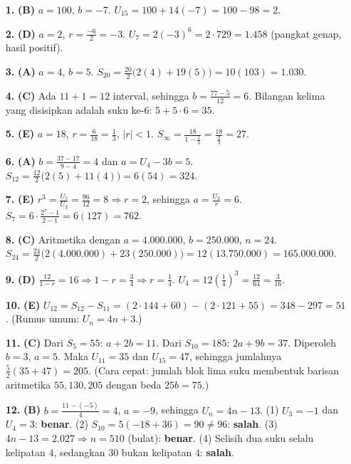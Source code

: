 \documentclass[a4paper,11pt]{article}
\newcommand{\dis}{\displaystyle}
\begin{document}
\small\begin{enumerate}[leftmargin=2em,itemsep=2pt,topsep=2pt]
\item[\textbf{1.}] \textbf{(B)} $a=100$, $b=-7$. $U_{15}=100+14(-7)=100-98=2$.
\item[\textbf{2.}] \textbf{(D)} $a=2$, $r=\dis\frac{-6}{2}=-3$. $U_{7}=2(-3)^{6}=2\cdot729=1.458$ (pangkat genap, hasil positif).
\item[\textbf{3.}] \textbf{(A)} $a=4$, $b=5$. $S_{20}=\dis\frac{20}{2}\big(2(4)+19(5)\big)=10(103)=1.030$.
\item[\textbf{4.}] \textbf{(C)} Ada $11+1=12$ interval, sehingga $b=\dis\frac{77-5}{12}=6$. Bilangan kelima yang disisipkan adalah suku ke-6: $5+5\cdot6=35$.
\item[\textbf{5.}] \textbf{(E)} $a=18$, $r=\dis\frac{6}{18}=\dis\frac13$, $|r|<1$. $S_\infty=\dis\frac{18}{1-\frac13}=\dis\frac{18}{\frac23}=27$.
\item[\textbf{6.}] \textbf{(A)} $b=\dis\frac{37-17}{9-4}=4$ dan $a=U_4-3b=5$. $S_{12}=\dis\frac{12}{2}\big(2(5)+11(4)\big)=6(54)=324$.
\item[\textbf{7.}] \textbf{(E)} $r^{3}=\dis\frac{U_5}{U_2}=\dis\frac{96}{12}=8\Rightarrow r=2$, sehingga $a=\dis\frac{U_2}{r}=6$. $S_7=6\cdot\dis\frac{2^{7}-1}{2-1}=6(127)=762$.
\item[\textbf{8.}] \textbf{(C)} Aritmetika dengan $a=4.000.000$, $b=250.000$, $n=24$. $S_{24}=\dis\frac{24}{2}\big(2(4.000.000)+23(250.000)\big)=12(13.750.000)=165.000.000$.
\item[\textbf{9.}] \textbf{(D)} $\dis\frac{12}{1-r}=16\Rightarrow1-r=\dis\frac34\Rightarrow r=\dis\frac14$. $U_4=12\left(\dis\frac14\right)^{3}=\dis\frac{12}{64}=\dis\frac{3}{16}$.
\item[\textbf{10.}] \textbf{(E)} $U_{12}=S_{12}-S_{11}=(2\cdot144+60)-(2\cdot121+55)=348-297=51$. (Rumus umum: $U_n=4n+3$.)
\item[\textbf{11.}] \textbf{(C)} Dari $S_5=55$: $a+2b=11$. Dari $S_{10}=185$: $2a+9b=37$. Diperoleh $b=3$, $a=5$. Maka $U_{11}=35$ dan $U_{15}=47$, sehingga jumlahnya $\dis\frac52(35+47)=205$. (Cara cepat: jumlah blok lima suku membentuk barisan aritmetika $55,130,205$ dengan beda $25b=75$.)
\item[\textbf{12.}] \textbf{(B)} $b=\dis\frac{11-(-5)}{4}=4$, $a=-9$, sehingga $U_n=4n-13$. (1) $U_3=-1$ dan $U_4=3$: \textbf{benar}. (2) $S_{10}=5(-18+36)=90\neq96$: \textbf{salah}. (3) $4n-13=2.027\Rightarrow n=510$ (bulat): \textbf{benar}. (4) Selisih dua suku selalu kelipatan $4$, sedangkan $30$ bukan kelipatan $4$: \textbf{salah}.

\end{enumerate}
\end{document}

